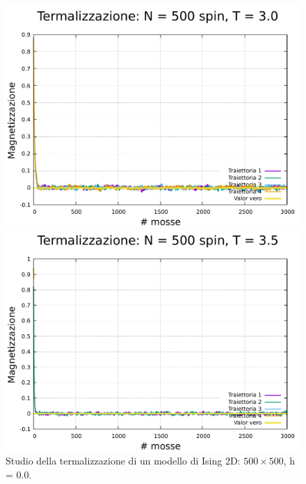 \begin{figure}[H]
    \begin{minipage}{0.45\textwidth}  
      \centering
      \includegraphics[page=1, width=\textwidth]{Immagini/simIsing2D/metro/term/term_500_3.0.pdf}
      \caption{$T\,=\,3.0$}
    \end{minipage}\hfill
    \begin{minipage}{0.45\textwidth}  
      \centering
      \includegraphics[page=1, width=\textwidth]{Immagini/simIsing2D/metro/term/term_500_3.5.pdf}
      \caption{$T\,=\,3.5$}
    \end{minipage}
    \caption{Studio della termalizzazione di un modello di Ising 2D: $500 \times 500$, h = 0.0.}
\end{figure}

